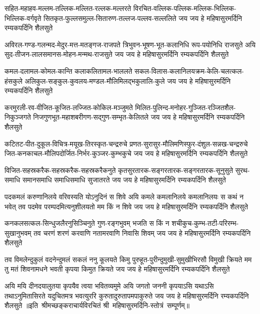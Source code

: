 \fourlineindentedshloka
{सहित-महाहव-मल्लम-तल्लिक-मल्लित-रल्लक-मल्लरते}
{विरचित-वल्लिक-पल्लिक-मल्लिक-भिल्लिक-भिल्लिक-वर्गवृते}
{सितकृत-फुल्लसमुल्ल-सितारुण-तल्लज-पल्लव-सल्ललिते}
{जय जय हे महिषासुरमर्दिनि रम्यकपर्दिनि शैलसुते}

\fourlineindentedshloka
{अविरल-गण्ड-गलन्मद-मेदुर-मत्त-मतङ्गज-राजपते}
{त्रिभुवन-भूषण-भूत-कलानिधि रूप-पयोनिधि राजसुते}
{अयि सुद-तीजन-लालसमानस-मोहन-मन्मथ-राजसुते}
{जय जय हे महिषासुरमर्दिनि रम्यकपर्दिनि शैलसुते}

\fourlineindentedshloka
{कमल-दलामल-कोमल-कान्ति कलाकलितामल-भाललते}
{सकल-विलास-कलानिलयक्रम-केलि-चलत्कल-हंसकुले}
{अलिकुल-सङ्कुल-कुवलय-मण्डल-मौलिमिलद्भकुलालि-कुले}
{जय जय हे महिषासुरमर्दिनि रम्यकपर्दिनि शैलसुते}

\fourlineindentedshloka
{करमुरली-रव-वीजित-कूजित-लज्जित-कोकिल-मञ्जुमते}
{मिलित-पुलिन्द-मनोहर-गुञ्जित-रञ्जितशैल-निकुञ्जगते}
{निजगुणभूत-महाशबरीगण-सद्गुण-सम्भृत-केलितले}
{जय जय हे महिषासुरमर्दिनि रम्यकपर्दिनि शैलसुते}

\fourlineindentedshloka
{कटितट-पीत-दुकूल-विचित्र-मयूख-तिरस्कृत-चन्द्ररुचे}
{प्रणत-सुरासुर-मौलिमणिस्फुर-दंशुल-सन्नख-चन्द्ररुचे}
{जित-कनकाचल-मौलिपदोर्जित-निर्भर-कुञ्जर-कुम्भकुचे}
{जय जय हे महिषासुरमर्दिनि रम्यकपर्दिनि शैलसुते}

\fourlineindentedshloka
{विजित-सहस्रकरैक-सहस्रकरैक-सहस्रकरैकनुते}
{कृतसुरतारक-सङ्गरतारक-सङ्गरतारक-सूनुसुते}
{सुरथ-समाधि समानसमाधि समाधिसमाधि सुजातरते}
{जय जय हे महिषासुरमर्दिनि रम्यकपर्दिनि शैलसुते}

\fourlineindentedshloka
{पदकमलं करुणानिलये वरिवस्यति योऽनुदिनं स शिवे}
{अयि कमले कमलानिलये कमलानिलयः स कथं न भवेत्}
{तव पदमेव परम्पदमित्यनुशीलयतो मम किं न शिवे}
{जय जय हे महिषासुरमर्दिनि रम्यकपर्दिनि शैलसुते}

\fourlineindentedshloka
{कनकलसत्कल-सिन्धुजलैरनुसिञ्चिनुते गुण-रङ्गभुवम्}
{भजति स किं न शचीकुच-कुम्भ-तटी-परिरम्भ-सुखानुभवम्}
{तव चरणं शरणं करवाणि नतामरवाणि निवासि शिवम्}
{जय जय हे महिषासुरमर्दिनि रम्यकपर्दिनि शैलसुते}

\fourlineindentedshloka
{तव विमलेन्दुकुलं वदनेन्दुमलं सकलं ननु कूलयते}
{किमु पुरुहूत-पुरीन्दुमुखी-सुमुखीभिरसौ विमुखी क्रियते}
{मम तु मतं शिवनामधने भवती कृपया किमुत क्रियते}
{जय जय हे महिषासुरमर्दिनि रम्यकपर्दिनि शैलसुते}

\fourlineindentedshloka
{अयि मयि दीनदयालुतया कृपयैव त्वया भवितव्यमुमे}
{अयि जगतो जननी कृपयाऽसि यथाऽसि तथाऽनुमितासिरते}
{यदुचितमत्र भवत्युररि कुरुतादुरुतापमपाकुरुते}
{जय जय हे महिषासुरमर्दिनि रम्यकपर्दिनि शैलसुते}
॥इति~श्रीमच्छङ्कराचार्यविरचितं
श्री~महिषासुरमर्दिनि-स्तोत्रं~सम्पूर्णम्॥
\setlength{\shlokaspaceskip}{24pt}